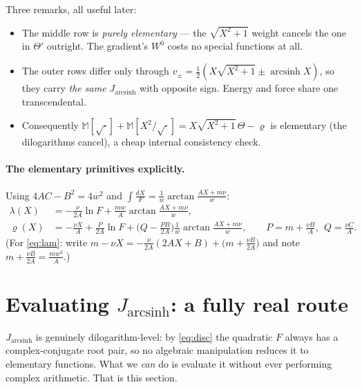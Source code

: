 \documentclass[11pt]{article}
\numberwithin{equation}{section}
\newcommand{\half}{\tfrac{1}{2}}
\DeclareMathOperator{\arcsinh}{arcsinh}
\begin{document}
Three remarks, all useful later:
\begin{itemize}
\item The middle row is \emph{purely elementary} --- the $\sqrt{X^2+1}$ weight cancels the one in
  $\Theta'$ outright. The gradient's $W^0$ costs no special functions at all.
\item The outer rows differ only through $v_\pm=\half(X\sqrt{X^2+1}\pm\arcsinh X)$, so they carry
  \emph{the same} $J_{\arcsinh}$ with opposite sign. Energy and force share one transcendental.
\item Consequently $\mathbb M[\sqrt{\cdot}]+\mathbb M[X^2/\sqrt{\cdot}]=X\sqrt{X^2+1}\,\Theta-\varrho$
  is elementary (the dilogarithms cancel), a cheap internal consistency check.
\end{itemize}

\paragraph{The elementary primitives explicitly.} Using $4AC-B^2=4w^2$ and
$\int\frac{dX}{F}=\frac1w\arctan\frac{AX+m\nu}{w}$:
\begin{align}
  \lambda(X)&=-\frac{\nu}{2A}\ln F+\frac{mw}{A}\arctan\frac{AX+m\nu}{w},\label{eq:lam}\\
  \varrho(X)&=-\frac{\nu X}{A}+\frac{P}{2A}\ln F
    +\Big(Q-\frac{PB}{2A}\Big)\frac1w\arctan\frac{AX+m\nu}{w},
    \qquad P=m+\frac{\nu B}{A},\ \ Q=\frac{\nu C}{A}.\label{eq:rho}
\end{align}
(For \eqref{eq:lam}: write $m-\nu X=-\frac{\nu}{2A}(2AX+B)+\big(m+\frac{\nu B}{2A}\big)$ and note
$m+\frac{\nu B}{2A}=\frac{mw^2}{A}$.)

\section{Evaluating \texorpdfstring{$J_{\arcsinh}$}{J\_arcsinh}: a fully real route}\label{sec:J}

$J_{\arcsinh}$ is genuinely dilogarithm-level: by \eqref{eq:disc} the quadratic $F$ always has a
complex-conjugate root pair, so no algebraic manipulation reduces it to elementary functions. What we
\emph{can} do is evaluate it without ever performing complex arithmetic. That is this section.
\end{document}
